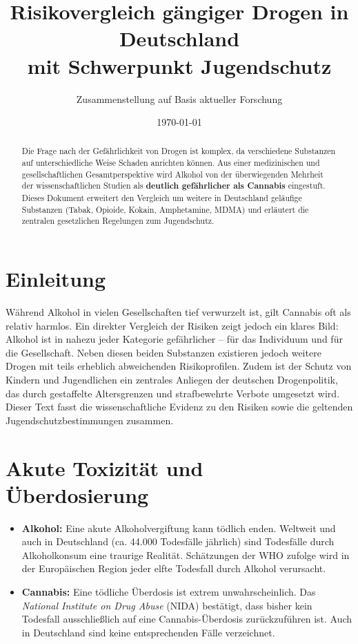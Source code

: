 \documentclass[11pt,a4paper]{article}
\title{Risikovergleich gängiger Drogen in Deutschland \\ mit Schwerpunkt Jugendschutz}
\author{Zusammenstellung auf Basis aktueller Forschung}
\date{\today}
\begin{document}
	
	\maketitle
	
	\begin{abstract}
		Die Frage nach der Gefährlichkeit von Drogen ist komplex, da verschiedene Substanzen auf unterschiedliche Weise Schaden anrichten können. Aus einer medizinischen und gesellschaftlichen Gesamtperspektive wird Alkohol von der überwiegenden Mehrheit der wissenschaftlichen Studien als \textbf{deutlich gefährlicher als Cannabis} eingestuft. Dieses Dokument erweitert den Vergleich um weitere in Deutschland geläufige Substanzen (Tabak, Opioide, Kokain, Amphetamine, MDMA) und erläutert die zentralen gesetzlichen Regelungen zum Jugendschutz.
	\end{abstract}
	
	\section{Einleitung}
	
	Während Alkohol in vielen Gesellschaften tief verwurzelt ist, gilt Cannabis oft als relativ harmlos. Ein direkter Vergleich der Risiken zeigt jedoch ein klares Bild: Alkohol ist in nahezu jeder Kategorie gefährlicher – für das Individuum und für die Gesellschaft. Neben diesen beiden Substanzen existieren jedoch weitere Drogen mit teils erheblich abweichenden Risikoprofilen. Zudem ist der Schutz von Kindern und Jugendlichen ein zentrales Anliegen der deutschen Drogenpolitik, das durch gestaffelte Altersgrenzen und strafbewehrte Verbote umgesetzt wird. Dieser Text fasst die wissenschaftliche Evidenz zu den Risiken sowie die geltenden Jugendschutzbestimmungen zusammen.
	
	\section{Akute Toxizität und Überdosierung}
	
	\begin{itemize}[leftmargin=*, noitemsep]
		\item \textbf{Alkohol:} Eine akute Alkoholvergiftung kann tödlich enden. Weltweit und auch in Deutschland (ca. 44.000 Todesfälle jährlich\cite{who-deaths}\cite{dhs-deaths}) sind Todesfälle durch Alkoholkonsum eine traurige Realität. Schätzungen der WHO zufolge wird in der Europäischen Region jeder elfte Todesfall durch Alkohol verursacht\cite{who-deaths}.
		\item \textbf{Cannabis:} Eine tödliche Überdosis ist extrem unwahrscheinlich. Das \textit{National Institute on Drug Abuse} (NIDA) bestätigt, dass bisher kein Todesfall ausschließlich auf eine Cannabis-Überdosis zurückzuführen ist\cite{nida-no-overdose}. Auch in Deutschland sind keine entsprechenden Fälle verzeichnet\cite{bmg-cannabis}.
	\end{itemize}
	
\end{document}
